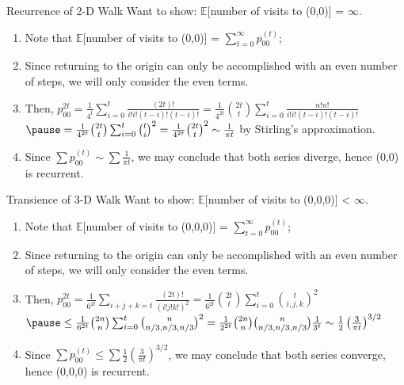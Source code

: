 \documentclass[aspectratio=169, handout]{beamer}
\newcommand{\ee}[0]{\mathbb{E}}
\begin{document}
\begin{frame}{Recurrence of 2-D Walk}
    Want to show: $\ee[$number of visits to (0,0)] = $\infty$.\pause
    \begin{pf}
        \begin{enumerate}
            \item Note that $\ee[$number of visits to (0,0)] = $\sum_{t=0}^\infty p_{00}^{(t)}$;\pause
            \item Since returning to the origin can only be accomplished with an even number of steps, we will only consider the even terms.\pause
            \item Then, 
            $
                p_{00}^{2t} = \frac{1}{4^t}\sum_{i=0}^t\frac{(2t)!}{i!i!(t-i)!(t-i)!}
                = \frac{1}{4^{2t}}{2t \choose t}\sum_{i=0}^t\frac{n!n!}{i!i!(t-i)!(t-i)!}$$ \pause
                = \frac{1}{4^{2t}}{2t \choose t}\sum_{i=0}^t{t \choose i}^2
                = \frac{1}{4^{2t}}{2t \choose t}^2
                \sim \frac{1}{\pi t}
            $ by Stirling's approximation. \pause
            \item Since $\sum p_{00}^{(t)} \sim \sum \frac{1}{\pi t}$, we may conclude that \pause both series diverge, hence (0,0) is recurrent.
        \end{enumerate}
    \end{pf}
\end{frame}

\begin{frame}{Transience of 3-D Walk}
    Want to show: $\ee[$number of visits to (0,0,0)] < $\infty$.\pause
    \begin{pf}
        \begin{enumerate}
            \item Note that $\ee[$number of visits to (0,0,0)] = $\sum_{t=0}^\infty p_{00}^{(t)}$;\pause
            \item Since returning to the origin can only be accomplished with an even number of steps, we will only consider the even terms.\pause
            \item Then, 
            $
                p_{00}^{2t} = \frac{1}{6^{2t}}\sum_{i+j+k=t}\frac{(2t)!}{(i!j!k!)^2}
                = \frac{1}{6^{2t}}{2t \choose t}\sum_{i=0}^t {t \choose i,j,k}^2
                $$ \pause
                \leq \frac{1}{6^{2t}}{2n \choose n}\sum_{i=0}^t{n \choose n/3,n/3,n/3}^2
                = \frac{1}{2^{2t}}{2n \choose n}{n \choose n/3,n/3,n/3}\frac{1}{3^t}
                \sim \frac{1}{2}\left(\frac{3}{\pi t}\right)^{3/2}
            $\pause
            \item Since $\sum p_{00}^{(t)} \leq \sum \frac{1}{2}\left(\frac{3}{\pi t}\right)^{3/2}$, we may conclude that \pause both series converge, hence (0,0,0) is recurrent.
        \end{enumerate}
    \end{pf}
\end{frame}
\end{document}
